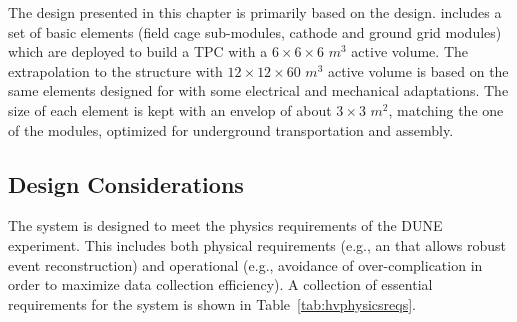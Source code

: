 The design presented in this chapter is primarily based on the  design.  includes a set of basic elements (field cage sub-modules, cathode and ground grid modules) which are deployed to build a TPC with a $6 \times 6 \times 6$ $m^3$ active volume. The extrapolation to the  structure with $12 \times 12 \times 60$ $m^3$ active volume is based on the same elements designed for  with some electrical and mechanical adaptations.  The size of each element is kept with an envelop of about $3 \times 3$ $m^2$, matching the one of the   modules, optimized for underground transportation and assembly.




\subsection{Design Considerations}
\label{sec:fddp-hv-des-consid}


The  system is designed to meet the physics requirements of the DUNE experiment. This includes both physical requirements (e.g., an \efield 
that allows robust event reconstruction) and operational (e.g., 
avoidance of over-complication in order to maximize data collection efficiency). 
A collection of essential requirements for the  system is shown in Table~\ref{tab:hvphysicsreqs}.

